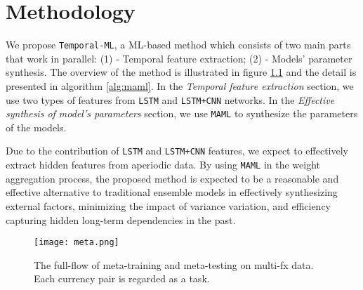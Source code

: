 
\chapter{Methodology}
\label{chap:method}


We propose \verb|Temporal-ML|, a ML-based method which consists of two main parts that work in parallel: (1) - Temporal feature extraction; (2) - Models' parameter synthesis. The overview of the method is illustrated in figure \ref{fig:flow} and the detail is presented in algorithm \ref{alg:maml}. In the \textit{Temporal feature extraction} section, we use two types of features from \verb|LSTM| and \verb|LSTM+CNN| networks. In the \textit{Effective synthesis of model's parameters} section, we use \verb|MAML| to synthesize the parameters of the models.

Due to the contribution of \verb|LSTM| and \verb|LSTM+CNN| features, we expect to effectively extract hidden features from aperiodic data. By using \verb|MAML| in the weight aggregation process, the proposed method is expected to be a reasonable and effective alternative to traditional ensemble models in effectively synthesizing external factors, minimizing the impact of variance variation, and efficiency capturing hidden long-term dependencies in the past.

\begin{figure}[H]
    \centering
    \texttt{[image: meta.png]}
    \caption{The full-flow of meta-training and meta-testing on multi-fx data. Each currency pair is regarded as a task.}
    \label{fig:flow}
\end{figure}

